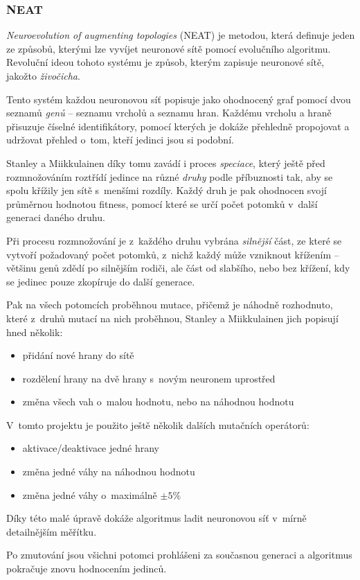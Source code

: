 \documentclass[a4]{article}
\begin{document}
\subsubsection{NEAT}
\emph{Neuroevolution of augmenting topologies}\cite{neat} (NEAT) je metodou, která definuje jeden ze způsobů, kterými lze vyvíjet neuronové sítě pomocí evolučního algoritmu. Revoluční ideou tohoto systému je způsob, kterým zapisuje neuronové sítě, jakožto \emph{živočicha}.\par
Tento systém každou neuronovou síť popisuje jako ohodnocený graf pomocí dvou seznamů \emph{genů} -- seznamu vrcholů a seznamu hran. Každému vrcholu a hraně přisuzuje číselné identifikátory, pomocí kterých je dokáže přehledně propojovat a udržovat přehled o~tom, kteří jedinci jsou si  podobní.\par
Stanley a Miikkulainen díky tomu zavádí i proces \emph{speciace}, který ještě před rozmnožováním roztřídí jedince na různé \emph{druhy} podle příbuznosti tak, aby se spolu křížily jen sítě s~menšími rozdíly. Každý druh je pak ohodnocen svojí průměrnou hodnotou fitness, pomocí které se určí počet potomků v~další generaci daného druhu.\par
Při procesu rozmnožování je z~každého druhu vybrána \emph{silnější} část, ze které se vytvoří požadovaný počet potomků, z~nichž každý může vzniknout křížením -- většinu genů zdědí po silnějším rodiči, ale část od slabšího, nebo bez křížení, kdy se jedinec pouze zkopíruje do další generace.\par
Pak na všech potomcích proběhnou mutace, přičemž je náhodně rozhodnuto, které z~druhů mutací na nich proběhnou, Stanley a Miikkulainen jich popisují hned několik:
\begin{itemize}
\item{přidání nové hrany do sítě}
\item{rozdělení hrany na dvě hrany s~novým neuronem uprostřed}
\item{změna všech vah o~malou hodnotu, nebo na náhodnou hodnotu}
\end{itemize}
V~tomto projektu je použito ještě několik dalších mutačních operátorů:
\begin{itemize}
\item{aktivace/deaktivace jedné hrany}
\item{změna jedné váhy na náhodnou hodnotu}
\item{změna jedné váhy o~maximálně $\pm 5\%$}
\end{itemize}
Díky této malé úpravě dokáže algoritmus ladit neuronovou síť v~mírně detailnějším měřítku.\par
Po zmutování jsou všichni potomci prohlášeni za současnou generaci a algoritmus pokračuje znovu hodnocením jedinců.
\end{document}
